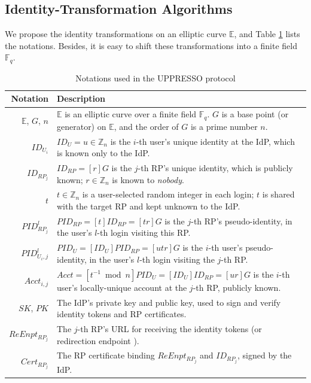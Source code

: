 \subsection{Identity-Transformation Algorithms}
\label{subsec:overview}

We propose the identity transformations on an elliptic curve $\mathbb{E}$,
and Table \ref{tbl:notations-protocol} lists the notations.
Besides, it is easy to shift these transformations into a finite field $\mathbb{F}_q$.


\begin{table}[tb]
\footnotesize
    \caption{Notations used in the UPPRESSO protocol}
    \centering
    \begin{tabular}{|r|p{6.79cm}|} \hline
    {\textbf{Notation}} & {\textbf{Description}} \\ \hline
    {$\mathbb{E}$, $G$, $n$} & {$\mathbb{E}$ is an elliptic curve over a finite field $\mathbb{F}_q$. $G$ is a base point (or generator) on $\mathbb{E}$, and the order of $G$ is a prime number $n$.} \\ \hline
    {$ID_{U_i}$} & {$ID_U = u \in \mathbb{Z}_n$ is the $i$-th user's unique identity at the IdP, which is known only to the IdP.} \\ \hline
   {$ID_{RP_j}$} & {$ID_{RP} = [r]G$ is the $j$-th RP's unique identity, which is publicly known; $r \in \mathbb{Z}_n$ is known to \emph{nobody}.} \\ \hline
    {$t$} & {$t \in \mathbb{Z}_n$ is a user-selected random integer in each login; $t$ is shared with the target RP and kept unknown to the IdP.} \\ \hline
    {$PID_{RP_j}^l$} & {$PID_{RP} = [t]{ID_{RP}} = [tr]G$ is the $j$-th RP's pseudo-identity, in the user's $l$-th login visiting this RP.} \\ \hline
    {$PID_{U_i,j}^l$} & {$PID_U = [{ID_U}]{PID_{RP}} = [utr]G$ is the $i$-th user's pseudo-identity, in the user's $l$-th login visiting the $j$-th RP.} \\ \hline
     {$Acct_{i,j}$} & {$Acct = [t^{-1}\bmod n]PID_{U} = [ID_U]ID_{RP} = [ur]G$ is the $i$-th user's locally-unique account at the $j$-th RP, publicly known.} \\ \hline
    {$SK$, $PK$} & {The IdP's private key and public key, used to sign and verify identity tokens and RP certificates.} \\ \hline
    {$ReEnpt_{RP_j}$} & {The $j$-th RP's URL for receiving the identity tokens (or redirection endpoint \cite{rfc6749}).} \\ \hline
    {$Cert_{RP_j}$} & {The RP certificate binding $ReEnpt_{RP_j}$ and $ID_{RP_j}$, signed by the IdP.} \\ \hline
    \end{tabular}
    \label{tbl:notations-protocol}
\end{table}

